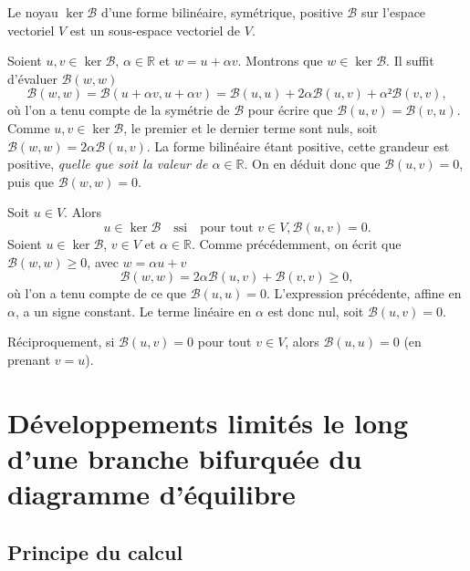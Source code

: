 \documentclass[12pt, final]{amsart}
\begin{document}
Le noyau \(\ker\mathcal B\) d'une forme bilinéaire, symétrique, positive \(\mathcal B\) sur
l'espace vectoriel \(V\) est un sous-espace vectoriel de \(V\).


  Soient \(u, v\in\ker\mathcal B\), \(\alpha\in\mathbb R \) et \(w=u+\alpha v\). Montrons que \(w\in\ker\mathcal B\). Il
  suffit d'évaluer \(\mathcal B(w, w)\)
  \begin{equation}
    \mathcal B(w, w)=\mathcal B(u+\alpha v, u+\alpha v)=\mathcal B(u, u)+2\alpha\mathcal B(u, v)+\alpha²\mathcal B(v, v),
  \end{equation}
  où l'on a tenu compte de la symétrie de \(\mathcal B\) pour écrire que
  \(\mathcal B(u, v)=\mathcal B(v, u)\). Comme \(u, v\in\ker\mathcal B\), le premier et le dernier terme
  sont nuls, soit \(\mathcal B(w, w)=2\alpha\mathcal B(u, v)\). La forme bilinéaire étant positive,
  cette grandeur est positive, \emph{quelle que soit la valeur de \(\alpha\in\mathbb R \)}. On
  en déduit donc que \(\mathcal B(u, v)=0\), puis que \(\mathcal B(w, w)=0\).

Soit \(u\in V\). Alors
\begin{equation}
  u\in\ker\mathcal B\quad\text{ssi}\quad\text{pour tout }v\in V, \mathcal B(u, v)=0.
\end{equation}
  Soient \(u\in\ker\mathcal B\), \(v\in V\) et \(\alpha\in\mathbb R \). Comme précédemment, on écrit que
  \(\mathcal B(w, w)\geq0\), avec \(w=\alpha u+v\)
  \begin{equation}
    \mathcal B(w, w)=2\alpha\mathcal B(u, v)+\mathcal B(v, v)\geq0,
  \end{equation}
  où l'on a tenu compte de ce que \(\mathcal B(u, u)=0\). L'expression précédente,
  affine en \(\alpha\), a un signe constant. Le terme linéaire en \(\alpha\) est donc
  nul, soit \(\mathcal B(u, v)=0\).

  Réciproquement, si \(\mathcal B(u, v)=0\) pour tout \(v\in V\), alors \(\mathcal B(u, u)=0\) (en
  prenant \(v=u\)).

\section{Développements limités le long d'une branche bifurquée du diagramme
  d'équilibre}

\subsection{Principe du calcul}
\label{sec20220107121442}
\end{document}
